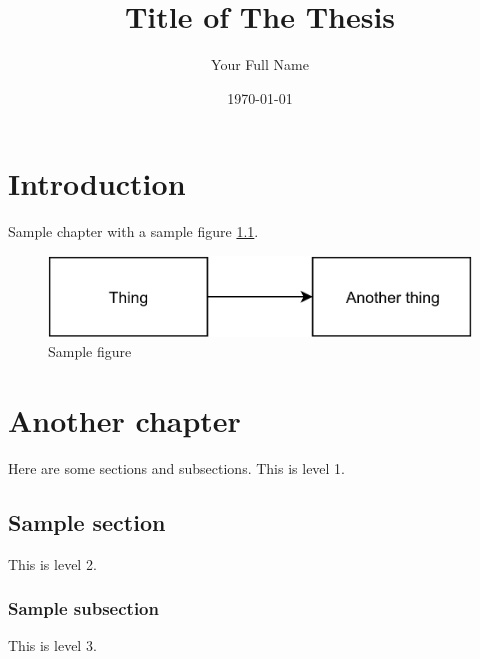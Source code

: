\documentclass[ieee]{qutad}
\author{Your Full Name}
\date{\today}
\title{Title of The Thesis}
\begin{document}
\makefrontmatter

\chapter{Introduction}
\label{sec:orgeccc783}
Sample chapter with a sample figure \ref{thefig}.
\lipsum

\begin{figure}[htbp]
\centering
\includegraphics[width=.9\linewidth]{./samplefig.png}
\caption{Sample figure \label{thefig}}
\end{figure}

\chapter{Another chapter}
\label{sec:org3b8299d}
Here are some sections and subsections. This is level 1.
\lipsum

\section{Sample section}
\label{sec:org75cca43}
This is level 2.
\lipsum

\subsection{Sample subsection}
\label{sec:orgcbb5461}
This is level 3.
\lipsum
\end{document}
